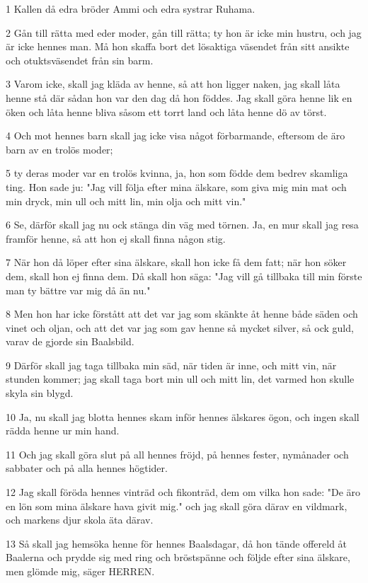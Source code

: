\par 1 Kallen då edra bröder Ammi och edra systrar Ruhama.
\par 2 Gån till rätta med eder moder, gån till rätta; ty hon är icke min hustru, och jag är icke hennes man. Må hon skaffa bort det lösaktiga väsendet från sitt ansikte och otuktsväsendet från sin barm.
\par 3 Varom icke, skall jag kläda av henne, så att hon ligger naken, jag skall låta henne stå där sådan hon var den dag då hon föddes. Jag skall göra henne lik en öken och låta henne bliva såsom ett torrt land och låta henne dö av törst.
\par 4 Och mot hennes barn skall jag icke visa något förbarmande, eftersom de äro barn av en trolös moder;
\par 5 ty deras moder var en trolös kvinna, ja, hon som födde dem bedrev skamliga ting. Hon sade ju: "Jag vill följa efter mina älskare, som giva mig min mat och min dryck, min ull och mitt lin, min olja och mitt vin."
\par 6 Se, därför skall jag nu ock stänga din väg med törnen. Ja, en mur skall jag resa framför henne, så att hon ej skall finna någon stig.
\par 7 När hon då löper efter sina älskare, skall hon icke få dem fatt; när hon söker dem, skall hon ej finna dem. Då skall hon säga: "Jag vill gå tillbaka till min förste man ty bättre var mig då än nu."
\par 8 Men hon har icke förstått att det var jag som skänkte åt henne både säden och vinet och oljan, och att det var jag som gav henne så mycket silver, så ock guld, varav de gjorde sin Baalsbild.
\par 9 Därför skall jag taga tillbaka min säd, när tiden är inne, och mitt vin, när stunden kommer; jag skall taga bort min ull och mitt lin, det varmed hon skulle skyla sin blygd.
\par 10 Ja, nu skall jag blotta hennes skam inför hennes älskares ögon, och ingen skall rädda henne ur min hand.
\par 11 Och jag skall göra slut på all hennes fröjd, på hennes fester, nymånader och sabbater och på alla hennes högtider.
\par 12 Jag skall föröda hennes vinträd och fikonträd, dem om vilka hon sade: "De äro en lön som mina älskare hava givit mig." och jag skall göra därav en vildmark, och markens djur skola äta därav.
\par 13 Så skall jag hemsöka henne för hennes Baalsdagar, då hon tände offereld åt Baalerna och prydde sig med ring och bröstspänne och följde efter sina älskare, men glömde mig, säger HERREN.

